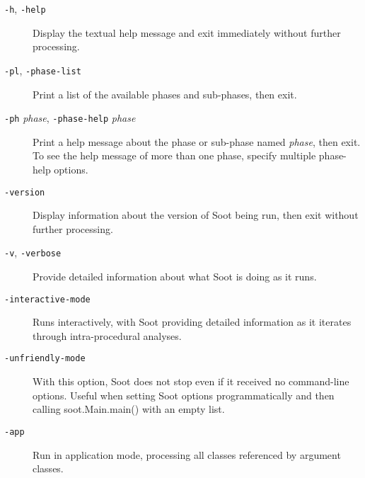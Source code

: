 \documentclass{article}
\begin{document}
\begin{description}

  \item[
  {\tt -h}, 
  {\tt -help}]

Display the textual help message and exit immediately without
further processing.



  \item[
  {\tt -pl}, 
  {\tt -phase-list}]

Print a list of the available phases and sub-phases, then exit.



  \item[
  {\tt -ph}{ \it phase}, 
  {\tt -phase-help}{ \it phase}]

Print a help message about the phase or sub-phase named
{\it phase}, then exit.  To see the help message of
more than one phase, specify multiple phase-help options.



  \item[
  {\tt -version}]

Display information about the version of Soot being run, then
exit without further processing.



  \item[
  {\tt -v}, 
  {\tt -verbose}]

Provide detailed information about what Soot is doing as it runs.



  \item[
  {\tt -interactive-mode}]

Runs interactively, with Soot providing detailed information as it iterates through intra-procedural analyses.



  \item[
  {\tt -unfriendly-mode}]

With this option, Soot does not stop even if it received no command-line options. Useful when setting Soot options programmatically and then calling soot.Main.main() with an empty list.



  \item[
  {\tt -app}]


\par

Run in application mode, processing all classes referenced by
argument classes.




\end{description}
\end{document}
